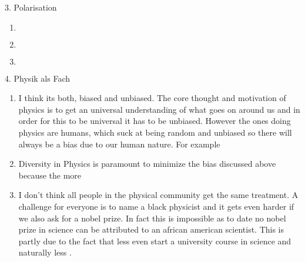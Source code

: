 \documentclass{alex_hü}
\begin{document}
\begin{mybox}{3. Polarisation}
	\centering \(  \)
	\tcblower
	\begin{enumerate}
		\item \(  \)
	\tcbline
		\item \(  \)
	\tcbline
		\item \(  \)
	\end{enumerate}
\end{mybox}

\begin{mybox}{4. Physik als Fach}
	\begin{enumerate}
		\item I think its both, biased and unbiased. The core thought and motivation of physics is to get an universal understanding of what goes on around us and in order for this to be universal it has to be unbiased. However the ones doing physics are humans, which suck at being random and unbiased so there will always be a bias due to our human nature. For example 
	\tcbline
		\item Diversity in Physics is paramount to minimize the bias discussed above because the more 
	\tcbline
		\item I don't think all people in the physical community get the same treatment. A challenge for everyone is to name a black physicist and it gets even harder if we also ask for a nobel prize. In fact this is impossible as to date no nobel prize in science can be attributed to an african american scientist. This is partly due to the fact that less    even start a university course in science and naturally less .
	\end{enumerate}
\end{mybox}
\end{document}
